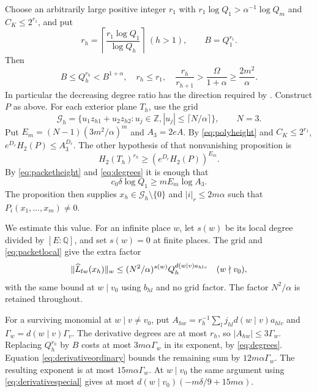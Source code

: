 \documentclass[11pt]{article}
\numberwithin{equation}{section}
\theoremstyle{remark}\newtheorem{remark}[theorem]{Remark}
\newcommand{\Q}{\mathbb Q}\newcommand{\Z}{\mathbb Z}
\begin{document}
Choose an arbitrarily large positive integer $r_1$ with
$r_1\log Q_1>\alpha^{-1}\log Q_m$ and $C_K\le2^{r_1}$, and put
\[
 r_h=\left\lceil\frac{r_1\log Q_1}{\log Q_h}\right\rceil\ (h>1),
 \qquad B=Q_1^{r_1}.
\]
Then
\begin{equation}\label{eq:degrees}
 B\le Q_h^{r_h}<B^{1+\alpha},\quad r_h\le r_1,\quad
 \frac{r_h}{r_{h+1}}>\frac{\Omega}{1+\alpha}\ge\frac{2m^2}{\alpha}.
\end{equation}
In particular the decreasing degree ratio has the direction required
by \cite[Proposition~12.1, equation (12.3)]{EF13}.
Construct $P$ as above. For each exterior plane $T_h$, use the grid
\[
 \mathcal G_h=\{u_1z_{h1}+u_2z_{h2}:u_j\in\Z,
                    |u_j|\le\lceil N/\alpha\rceil\},\qquad N=3.
\]
Put $E_m=(N-1)(3m^2/\alpha)^m$ and $A_3=2eA$.
By \eqref{eq:polyheight} and $C_K\le2^{r_1}$,
$e^{D_r}H_2(P)\le A_3^{D_r}$.
The other hypothesis of that nonvanishing proposition is
\begin{equation}\label{eq:nonvanishheight}
 H_2(T_h)^{r_h}\ge(e^{D_r}H_2(P))^{E_m}.
\end{equation}
By \eqref{eq:packetheight} and \eqref{eq:degrees} it is enough that
\begin{equation}\label{eq:cutoffone}
 c_0\delta\log Q_1\ge mE_m\log A_3.
\end{equation}
The proposition then supplies $x_h\in\mathcal G_h\setminus\{0\}$ and
$|i|_r\le2m\alpha$ such that $P_i(x_1,\ldots,x_m)\ne0$.

We estimate this value. For an infinite place $w$, let $s(w)$ be its
local degree divided by $[E:\Q]$, and set $s(w)=0$ at finite places.
The grid and \eqref{eq:packetlocal} give the extra factor
\begin{equation}\label{eq:gridfactor}
 \|\widehat L_{lw}(x_h)\|_w\le
 (N^2/\alpha)^{s(w)}Q_h^{d(w\mid v)a_{hlv}}\quad(w\nmid v_0),
\end{equation}
with the same bound at $w\mid v_0$ using $b_{hl}$ and no grid factor.
The factor $N^2/\alpha$ is retained throughout.

For a surviving monomial at $w\mid v\ne v_0$, put
$A_{hw}=r_h^{-1}\sum_lj_{hl}d(w\mid v)a_{hlv}$ and
$\Gamma_w=d(w\mid v)\Gamma_v$.
The derivative degrees are at most $r_h$, so $|A_{hw}|\le3\Gamma_w$.
Replacing $Q_h^{r_h}$ by $B$ costs at most $3m\alpha\Gamma_w$ in its
exponent, by \eqref{eq:degrees}.
Equation \eqref{eq:derivativeordinary} bounds the remaining sum by
$12m\alpha\Gamma_w$. The resulting exponent is at most
$15m\alpha\Gamma_w$.
At $w\mid v_0$ the same argument using \eqref{eq:derivativespecial}
gives at most $d(w\mid v_0)(-m\delta/9+15m\alpha)$.
\end{document}
